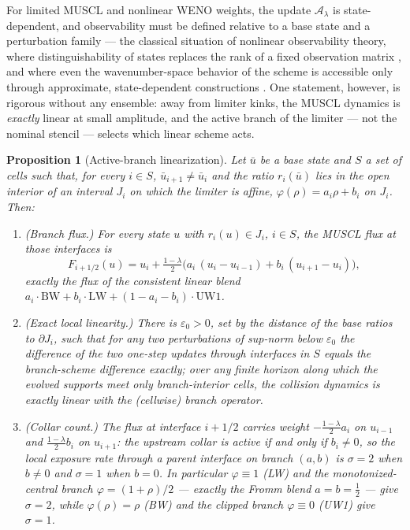 \documentclass[pdflatex,sn-mathphys-num]{sn-jnl}%
\theoremstyle{thmstyleone}%
\newtheorem{proposition}{Proposition}%
\theoremstyle{thmstyletwo}%
\theoremstyle{thmstylethree}%
\begin{document}
For limited MUSCL and nonlinear WENO weights, the update $\mathcal A_\lambda$ is state-dependent, and observability must be defined relative to a base state and a perturbation family --- the classical situation of nonlinear observability theory, where distinguishability of states replaces the rank of a fixed observation matrix \cite{HermannKrener1977}, and where even the wavenumber-space behavior of the scheme is accessible only through approximate, state-dependent constructions \cite{Pirozzoli2006}.
One statement, however, is rigorous without any ensemble: away from limiter kinks, the MUSCL dynamics is \emph{exactly} linear at small amplitude, and the active branch of the limiter --- not the nominal stencil --- selects which linear scheme acts.

\begin{proposition}[Active-branch linearization]\label{prop:active-branch}
Let $\bar u$ be a base state and $S$ a set of cells such that, for every $i\in S$, $\bar u_{i+1}\ne\bar u_i$ and the ratio $r_i(\bar u)$ lies in the open interior of an interval $J_i$ on which the limiter is affine, $\varphi(\rho)=a_i\rho+b_i$ on $J_i$.
Then:
\begin{enumerate}
\item[(i)] (\emph{Branch flux.})
      For every state $u$ with $r_i(u)\in J_i$, $i\in S$, the MUSCL flux at those interfaces is \[ F_{i+1/2}(u) = u_i+\tfrac{1-\lambda}2\bigl(a_i\,(u_i-u_{i-1})+b_i\,(u_{i+1}-u_i)\bigr), \] exactly the flux of the consistent linear blend $a_i\cdot\mathrm{BW}+b_i\cdot\mathrm{LW}+(1-a_i-b_i)\cdot\mathrm{UW1}$.
\item[(ii)] (\emph{Exact local linearity.})
      There is $\varepsilon_0>0$, set by the distance of the base ratios to $\partial J_i$, such that for any two perturbations of sup-norm below $\varepsilon_0$ the difference of the two one-step updates through interfaces in $S$ equals the branch-scheme difference exactly; over any finite horizon along which the evolved supports meet only branch-interior cells, the collision dynamics is exactly linear with the (cellwise) branch operator.
\item[(iii)] (\emph{Collar count.})
      The flux at interface $i+1/2$ carries weight $-\tfrac{1-\lambda}2a_i$ on $u_{i-1}$ and $\tfrac{1-\lambda}2b_i$ on $u_{i+1}$: the upstream collar is active if and only if $b_i\ne0$, so the local exposure rate through a parent interface on branch $(a,b)$ is $\sigma=2$ when $b\ne0$ and $\sigma=1$ when $b=0$.
      In particular $\varphi\equiv1$ (LW) and the monotonized-central branch $\varphi=(1+\rho)/2$ --- exactly the Fromm blend $a=b=\tfrac12$ --- give $\sigma=2$, while $\varphi(\rho)=\rho$ (BW) and the clipped branch $\varphi\equiv0$ (UW1) give $\sigma=1$.
\end{enumerate}
\end{proposition}
\end{document}
